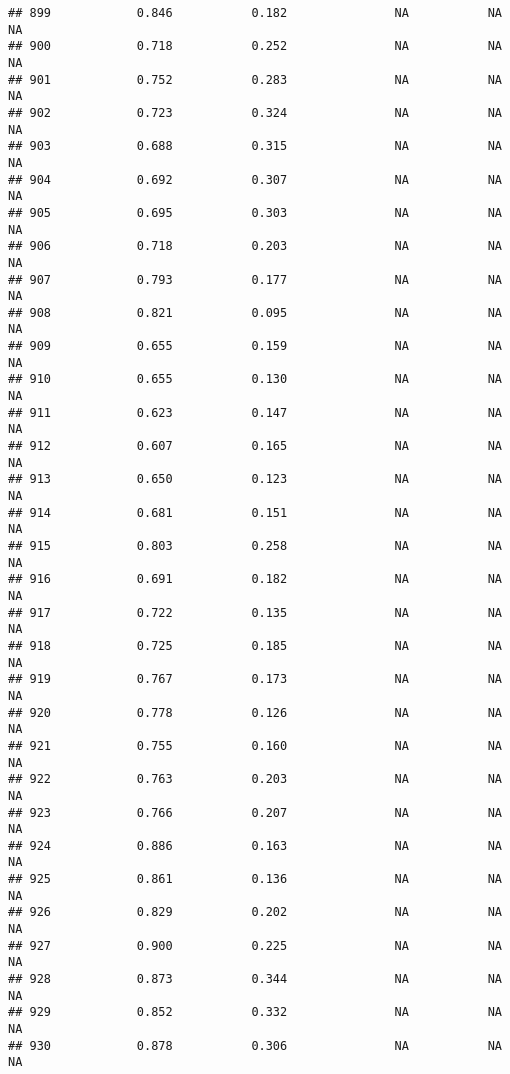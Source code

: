 \documentclass[
]{article}
\begin{document}
\begin{verbatim}
## 899            0.846           0.182               NA           NA           NA
## 900            0.718           0.252               NA           NA           NA
## 901            0.752           0.283               NA           NA           NA
## 902            0.723           0.324               NA           NA           NA
## 903            0.688           0.315               NA           NA           NA
## 904            0.692           0.307               NA           NA           NA
## 905            0.695           0.303               NA           NA           NA
## 906            0.718           0.203               NA           NA           NA
## 907            0.793           0.177               NA           NA           NA
## 908            0.821           0.095               NA           NA           NA
## 909            0.655           0.159               NA           NA           NA
## 910            0.655           0.130               NA           NA           NA
## 911            0.623           0.147               NA           NA           NA
## 912            0.607           0.165               NA           NA           NA
## 913            0.650           0.123               NA           NA           NA
## 914            0.681           0.151               NA           NA           NA
## 915            0.803           0.258               NA           NA           NA
## 916            0.691           0.182               NA           NA           NA
## 917            0.722           0.135               NA           NA           NA
## 918            0.725           0.185               NA           NA           NA
## 919            0.767           0.173               NA           NA           NA
## 920            0.778           0.126               NA           NA           NA
## 921            0.755           0.160               NA           NA           NA
## 922            0.763           0.203               NA           NA           NA
## 923            0.766           0.207               NA           NA           NA
## 924            0.886           0.163               NA           NA           NA
## 925            0.861           0.136               NA           NA           NA
## 926            0.829           0.202               NA           NA           NA
## 927            0.900           0.225               NA           NA           NA
## 928            0.873           0.344               NA           NA           NA
## 929            0.852           0.332               NA           NA           NA
## 930            0.878           0.306               NA           NA           NA

\end{verbatim}
\end{document}
